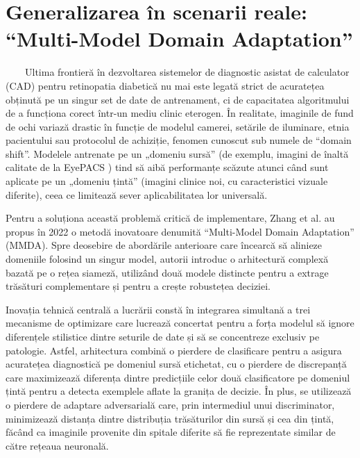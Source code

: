 \documentclass[12pt, a4paper, oneside, romanian]{teza-upb}
\begin{document}
\section{Generalizarea în scenarii reale: “Multi-Model Domain Adaptation” \cite{8_zhang2022multi}}

\ \ \ \ Ultima frontieră în dezvoltarea sistemelor de diagnostic asistat de calculator (CAD) pentru
retinopatia diabetică nu mai este legată strict de acuratețea obținută pe un singur set de date de
antrenament, ci de capacitatea algoritmului de a funcționa corect într-un mediu clinic eterogen. În
realitate, imaginile de fund de ochi variază drastic în funcție de modelul camerei, setările de iluminare,
etnia pacientului sau protocolul de achiziție, fenomen cunoscut sub numele de “domain shift”. Modelele
antrenate pe un „domeniu sursă” (de exemplu, imagini de înaltă calitate de la EyePACS \cite{9_chetoui2020explainable}) tind să aibă
performanțe scăzute atunci când sunt aplicate pe un „domeniu țintă” (imagini clinice noi, cu
caracteristici vizuale diferite), ceea ce limitează sever aplicabilitatea lor universală.
\bigskip

Pentru a soluționa această problemă critică de implementare, Zhang et al. \cite{8_zhang2022multi} au propus în 2022
o metodă inovatoare denumită “Multi-Model Domain Adaptation” (MMDA). Spre deosebire de
abordările anterioare care încearcă să alinieze domeniile folosind un singur model, autorii introduc o
arhitectură complexă bazată pe o rețea siameză, utilizând două modele distincte pentru a extrage
trăsături complementare și pentru a crește robustețea deciziei.
\bigskip

Inovația tehnică centrală a lucrării constă în integrarea simultană a trei mecanisme de optimizare
care lucrează concertat pentru a forța modelul să ignore diferențele stilistice dintre seturile de date și să
se concentreze exclusiv pe patologie. Astfel, arhitectura combină o pierdere de clasificare pentru a
asigura acuratețea diagnostică pe domeniul sursă etichetat, cu o pierdere de discrepanță care
maximizează diferența dintre predicțiile celor două clasificatore pe domeniul țintă pentru a detecta
exemplele aflate la granița de decizie. În plus, se utilizează o pierdere de adaptare adversarială care, prin
intermediul unui discriminator, minimizează distanța dintre distribuția trăsăturilor din sursă și cea din
țintă, făcând ca imaginile provenite din spitale diferite să fie reprezentate similar de către rețeaua
neuronală.
\bigskip
\end{document}
